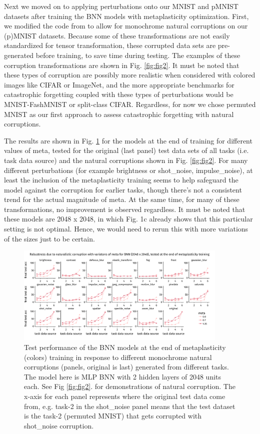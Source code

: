 \documentclass[manuscript,screen,review]{acmart}
\begin{document}
Next we moved on to applying perturbations onto our MNIST and pMNIST datasets after training the BNN models with metaplasticity optimization. First, we modified the code from \cite{Hendrycks_2018} to allow for monochrome natural corruptions on our (p)MNIST datasets. Because some of these transformations are not easily standardized for tensor transformation, these corrupted data sets are pre-generated before training, to save time during testing. The examples of these corruption transformations are shown in Fig. \ref{fig:fig2}. It must be noted that these types of corruption are possibly more realistic when considered with colored images like CIFAR or ImageNet, and the more appropriate benchmarks for catastrophic forgetting coupled with these types of perturbations would be MNIST-FashMNIST or split-class CIFAR. Regardless, for now we chose permuted MNIST as our first approach to assess catastrophic forgetting with natural corruptions.

The results are shown in Fig. \ref{fig:fig3} for the models at the end of training for different values of meta, tested for the original (last panel) test data sets of all tasks (i.e. task data source) and the natural corruptions shown in Fig. \ref{fig:fig2}. For many different perturbations (for example brightness or shot\_noise, impulse\_noise), at least the inclusion of the metaplasticity training seems to help safeguard the model against the corruption for earlier tasks, though there’s not a consistent trend for the actual magnitude of meta. At the same time, for many of these transformations, no improvement is observed regardless. It must be noted that these models are 2048 x 2048, in which Fig. 1c already shows that this particular setting is not optimal. Hence, we would need to rerun this with more variations of the sizes just to be certain. 


\begin{figure}[h]
    \centering
    \includegraphics[width=0.9\textwidth]{figures/report/Fig3.png}
    \caption{Test performance of the BNN models at the end of metaplasticity (colors) training in response to different monochrome natural corruptions (panels, original is last) generated from different tasks. The model here is MLP BNN with 2 hidden layers of 2048 units each. See Fig \ref{fig:fig2}. for demonstrations of natural corruption. The x-axis for each panel represents where the original test data come from, e.g. task-2 in the shot\_noise panel means that the test dataset is the task-2 (permuted MNIST) that gets corrupted with shot\_noise corruption. }
    \label{fig:fig3}
\end{figure}
\end{document}
